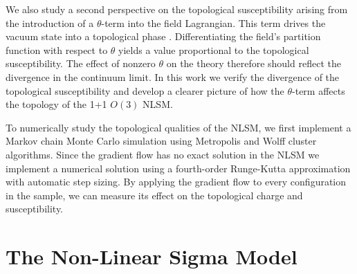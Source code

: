 \documentclass[a4paper,11pt]{article}
\begin{document}
We also study a second perspective on the topological susceptibility arising from the introduction of a $\theta$-term into the field Lagrangian. This term drives the vacuum state into a topological phase \cite{allessalom2008}. Differentiating the field's partition function with respect to $\theta$ yields a value proportional to the topological susceptibility. The effect of nonzero $\theta$ on the theory therefore should reflect the divergence in the continuum limit. In this work we verify the divergence of the topological susceptibility and develop a clearer picture of how the $\theta$-term affects the topology of the 1+1 $O(3)$ NLSM.

To numerically study the topological qualities of the NLSM, we first implement a Markov chain Monte Carlo simulation using Metropolis and Wolff cluster \cite{wolff1989} algorithms. Since the gradient flow has no exact solution in the NLSM we implement a numerical solution using a fourth-order Runge-Kutta approximation with automatic step sizing. By applying the gradient flow to every configuration in the sample, we can measure its effect on the topological charge and susceptibility.

\section{The Non-Linear Sigma Model}
\end{document}
